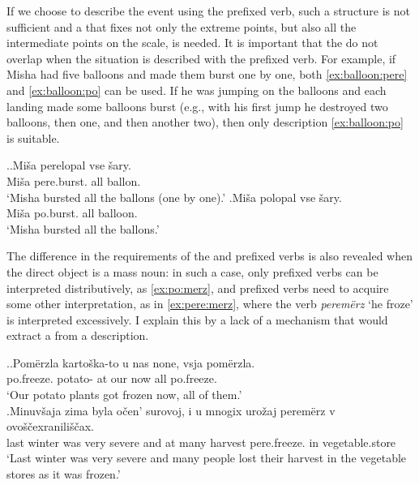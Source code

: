 If we choose to describe the event using the prefixed verb, such a structure is not sufficient and a  that fixes not only the extreme points, but also all the intermediate points on the scale, is needed. It is important that the  do not overlap when the situation is described with the prefixed verb. For example, if Misha had five balloons and made them burst one by one, both \ref{ex:balloon:pere} and \ref{ex:balloon:po} can be used. If he was jumping on the balloons and each landing made some balloons burst (e.g., with his first jump he destroyed two balloons, then one, and then another two), then only description \ref{ex:balloon:po} is suitable.\largerpage

\ex.\ag.\label{ex:balloon:pere}Mi\v{s}a perelopal vse \v{s}ary.\\
Mi\v{s}a pere.burst. all ballon.\\
\trans `Misha bursted all the ballons (one by one).'
\bg.\label{ex:balloon:po}Mi\v{s}a polopal vse \v{s}ary.\\
Mi\v{s}a po.burst. all balloon.\\
\trans `Misha bursted all the ballons.'

The difference in the requirements of the  and prefixed verbs is also revealed when the direct object is a mass noun: in such a case, only prefixed verbs can be interpreted distributively, as \ref{ex:po:merz}, and prefixed verbs need to acquire some other interpretation, as in \ref{ex:pere:merz}, where the verb \textit{perem\"{e}rz} `he froze' is interpreted excessively. I explain this by a lack of a mechanism that would extract a  from a  description.

\ex.\ag.\label{ex:po:merz}Pom\"{e}rzla karto\v{s}ka-to u nas none, vsja pom\"{e}rzla.\\
po.freeze. potato- at our now all po.freeze.\\
\trans `Our potato plants got frozen now, all of them.'\\
\bg.\label{ex:pere:merz}Minuv\v{s}aja zima byla o\v{c}en' surovoj, i u mnogix uro\v{z}aj perem\"{e}rz v ovo\v{s}\v{c}exranili\v{s}\v{c}ax.\\
last winter was very severe and at many harvest pere.freeze. in vegetable.store\\
\trans `Last winter was very severe and many people lost their harvest in the vegetable stores as it was frozen.'

